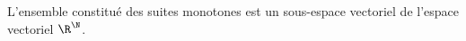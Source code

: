 L'ensemble constitué des suites monotones est un sous-espace vectoriel de l'espace vectoriel $\R^\N$.

\begin{reponses}
\end{reponses}


